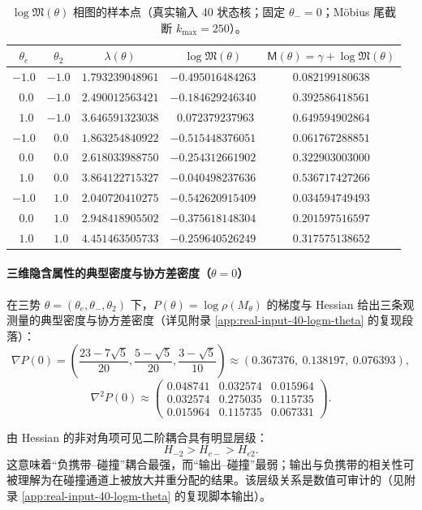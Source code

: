 \begin{table}[H]
\centering
\scriptsize
\setlength{\tabcolsep}{8pt}
\renewcommand{\arraystretch}{1.15}
\caption{$\log\mathfrak{M}(\theta)$ 相图的样本点（真实输入 40 状态核；固定 $\theta_-=0$；Möbius 尾截断 $k_{\max}=250$）。}
\label{tab:real-input-40-logM-theta-sample}
\begin{tabular}{@{}ccccc@{}}
\toprule
$\theta_e$ & $\theta_2$ & $\lambda(\theta)$ & $\log\mathfrak{M}(\theta)$ & $\mathsf{M}(\theta)=\gamma+\log\mathfrak{M}(\theta)$ \\
\midrule
$-1.0$ & $-1.0$ & $1.793239048961$ & $-0.495016484263$ & $0.082199180638$ \\
$\ \ 0.0$ & $-1.0$ & $2.490012563421$ & $-0.184629246340$ & $0.392586418561$ \\
$\ \ 1.0$ & $-1.0$ & $3.646591323038$ & $\ \ 0.072379237963$ & $0.649594902864$ \\
$-1.0$ & $\ \ 0.0$ & $1.863254840922$ & $-0.515448376051$ & $0.061767288851$ \\
$\ \ 0.0$ & $\ \ 0.0$ & $2.618033988750$ & $-0.254312661902$ & $0.322903003000$ \\
$\ \ 1.0$ & $\ \ 0.0$ & $3.864122715327$ & $-0.040498237636$ & $0.536717427266$ \\
$-1.0$ & $\ \ 1.0$ & $2.040720410275$ & $-0.542620915409$ & $0.034594749493$ \\
$\ \ 0.0$ & $\ \ 1.0$ & $2.948418905502$ & $-0.375618148304$ & $0.201597516597$ \\
$\ \ 1.0$ & $\ \ 1.0$ & $4.451463505733$ & $-0.259640526249$ & $0.317575138652$ \\
\bottomrule
\end{tabular}
\end{table}

\paragraph{三维隐含属性的典型密度与协方差密度（\texorpdfstring{$\theta=0$}{theta=0}）}
在三势 $\theta=(\theta_e,\theta_-,\theta_2)$ 下，$P(\theta)=\log\rho(M_\theta)$ 的梯度与 Hessian 给出三条观测量的典型密度与协方差密度（详见附录 \ref{app:real-input-40-logm-theta} 的复现段落）：
\[
\nabla P(0)=\left(\frac{23-7\sqrt5}{20},\frac{5-\sqrt5}{20},\frac{3-\sqrt5}{10}\right)\approx(0.367376,\ 0.138197,\ 0.076393),
\]
\[
\nabla^2P(0)\approx
\begin{pmatrix}
0.048741 & 0.032574 & 0.015964\\
0.032574 & 0.275035 & 0.115735\\
0.015964 & 0.115735 & 0.067331
\end{pmatrix}.
\]
\begin{remark}
由 Hessian 的非对角项可见二阶耦合具有明显层级：
\[
H_{-2}>H_{e-}>H_{e2}.
\]
这意味着“负携带--碰撞”耦合最强，而“输出--碰撞”最弱；输出与负携带的相关性可被理解为在碰撞通道上被放大并重分配的结果。该层级关系是数值可审计的（见附录 \ref{app:real-input-40-logm-theta} 的复现脚本输出）。
\end{remark}

